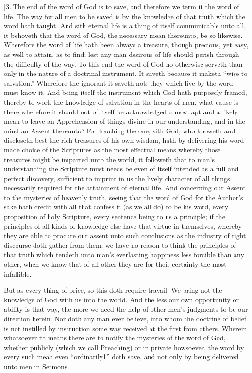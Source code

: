 [3.]The end of the word of God is to save, and therefore we term it the word of life. The way for all men to be saved is by the knowledge of that truth which the word hath taught. And sith eternal life is a thing of itself communicable unto all, it behoveth that the word of God, the necessary mean thereunto, be so likewise. Wherefore the word of life hath been always a treasure, though precious, yet easy, as well to attain, as to find; lest any man desirous of life should perish through the difficulty of the way. To this end the word of God no otherwise serveth than only in the nature of a doctrinal instrument. It saveth because it maketh “wise to salvation.” Wherefore the ignorant it saveth not; they which live by the word must know it. And being itself the instrument which God hath purposely framed, thereby to work the knowledge of salvation in the hearts of men, what cause is there wherefore it should not of itself be acknowledged a most apt and a likely mean to leave an Apprehension of things divine in our understanding, and in the mind an Assent thereunto? For touching the one, sith God, who knoweth and discloseth best the rich treasures of his own wisdom, hath by delivering his word made choice of the Scriptures as the most effectual means whereby those treasures might be imparted unto the world, it followeth that to man’s understanding the Scripture must needs be even of itself intended as a full and perfect discovery, sufficient to imprint in us the lively character of all things necessarily required for the attainment of eternal life. And concerning our Assent to the mysteries of heavenly truth,  seeing that the word of God for the Author’s sake hath credit with all that confess it (as we all do) to be his word, every proposition of holy Scripture, every sentence being to us a principle;
 if the principles of all kinds of knowledge else have that virtue in themselves, whereby they are able to procure our assent unto such conclusions as the industry of right discourse doth gather from them; we have no reason to think the principles of that truth which tendeth unto man’s everlasting happiness less forcible than any other, when we know that of all other they are for their certainty the most infallible.

But as every thing of price, so this doth require travail. We bring not the knowledge of God with us into the world. And the less our own opportunity or ability is that way, the more we need the help of other men’s judgments to be our direction herein. Nor doth any man ever believe, into whom the doctrine of belief is not instilled by instruction some way received at the first from others. Wherein whatsoever fit means there are to notify the mysteries of the word of God, whether publicly (which we call Preaching) or in private howsoever, the word by every such mean even “ordinarily1” doth save, and not only by being delivered unto men in Sermons.

